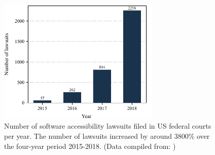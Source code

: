 \begin{figure}%
	\centering
	\includegraphics[width=0.70\columnwidth,height=6.0cm]{accessibility_testing/figures/lawsuits-plot}
	\caption{Number of software accessibility lawsuits filed in US federal courts per year. The number of lawsuits increased by around 3800\% over the four-year period 2015-2018. (Data compiled from: \cite{stats:accessibility_lawsuits:US_1, stats:accessibility_lawsuits:US_2})}
	\label{fig:lawsuits-plot}
\end{figure} 